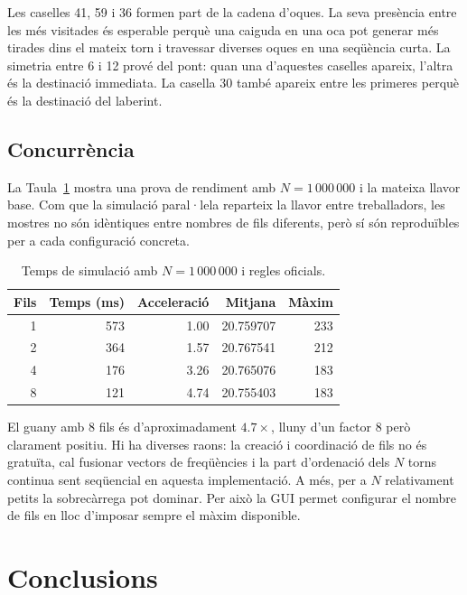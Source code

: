 \documentclass[conference,compsoc]{IEEEtran}
\begin{document}
Les caselles 41, 59 i 36 formen part de la cadena d'oques. La seva presència
entre les més visitades és esperable perquè una caiguda en una oca pot generar més
tirades dins el mateix torn i travessar diverses oques en una seqüència curta. La
simetria entre 6 i 12 prové del pont: quan una d'aquestes caselles apareix, l'altra
és la destinació immediata. La casella 30 també apareix entre les primeres perquè és
la destinació del laberint.

\subsection{Concurrència}

La Taula~\ref{tab:threads} mostra una prova de rendiment amb $N=1\,000\,000$ i la
mateixa llavor base. Com que la simulació paral·lela reparteix la llavor entre
treballadors, les mostres no són idèntiques entre nombres de fils diferents, però
sí són reproduïbles per a cada configuració concreta.

\begin{table}[H]
\centering
\caption{Temps de simulació amb $N=1\,000\,000$ i regles oficials.}
\label{tab:threads}
\footnotesize
\begin{tabular}{rrrrr}
\toprule
Fils & Temps (ms) & Acceleració & Mitjana & Màxim \\
\midrule
1 & 573 & 1.00 & 20.759707 & 233 \\
2 & 364 & 1.57 & 20.767541 & 212 \\
4 & 176 & 3.26 & 20.765076 & 183 \\
8 & 121 & 4.74 & 20.755403 & 183 \\
\bottomrule
\end{tabular}
\end{table}

El guany amb 8 fils és d'aproximadament $4.7\times$, lluny d'un factor 8 però
clarament positiu. Hi ha diverses raons: la creació i coordinació de fils no és
gratuïta, cal fusionar vectors de freqüències i la part d'ordenació dels $N$ torns
continua sent seqüencial en aquesta implementació. A més, per a $N$ relativament
petits la sobrecàrrega pot dominar. Per això la GUI permet configurar el nombre de
fils en lloc d'imposar sempre el màxim disponible.

\section{Conclusions}
\end{document}
